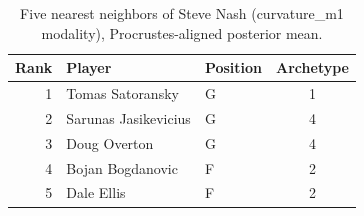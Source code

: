 \begin{table}[htbp]
  \centering\small
  \begin{tabular}{rllc}
    \toprule
    Rank & Player & Position & Archetype \\
    \midrule
    1 & Tomas Satoransky & G & 1 \\
    2 & Sarunas Jasikevicius & G & 4 \\
    3 & Doug Overton & G & 4 \\
    4 & Bojan Bogdanovic & F & 2 \\
    5 & Dale Ellis & F & 2 \\
    \bottomrule
  \end{tabular}
  \caption{Five nearest neighbors of Steve Nash (curvature_m1 modality), Procrustes-aligned posterior mean.}
  \label{tab:Steve_Nash_neighbors_curvature_m1}
\end{table}

